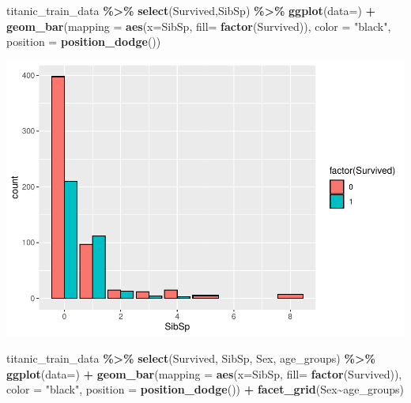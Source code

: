 \documentclass[
]{article}
\newenvironment{Shaded}{\begin{snugshade}}{\end{snugshade}}
\newcommand{\AttributeTok}[1]{\textcolor[rgb]{0.13,0.29,0.53}{#1}}
\newcommand{\FunctionTok}[1]{\textcolor[rgb]{0.13,0.29,0.53}{\textbf{#1}}}
\newcommand{\NormalTok}[1]{#1}
\newcommand{\SpecialCharTok}[1]{\textcolor[rgb]{0.81,0.36,0.00}{\textbf{#1}}}
\newcommand{\StringTok}[1]{\textcolor[rgb]{0.31,0.60,0.02}{#1}}
\begin{document}
\begin{Shaded}
\begin{Highlighting}[]
\NormalTok{titanic\_train\_data }\SpecialCharTok{\%\textgreater{}\%}
  \FunctionTok{select}\NormalTok{(Survived,SibSp) }\SpecialCharTok{\%\textgreater{}\%}
  \FunctionTok{ggplot}\NormalTok{(}\AttributeTok{data=}\NormalTok{) }\SpecialCharTok{+} 
  \FunctionTok{geom\_bar}\NormalTok{(}\AttributeTok{mapping =}  \FunctionTok{aes}\NormalTok{(}\AttributeTok{x=}\NormalTok{SibSp, }\AttributeTok{fill=} \FunctionTok{factor}\NormalTok{(Survived)), }\AttributeTok{color =} \StringTok{"black"}\NormalTok{, }\AttributeTok{position =} \FunctionTok{position\_dodge}\NormalTok{())}
\end{Highlighting}
\end{Shaded}

\includegraphics{Titanic-Documentation_files/figure-latex/unnamed-chunk-31-1.pdf}

\begin{Shaded}
\begin{Highlighting}[]
\NormalTok{titanic\_train\_data }\SpecialCharTok{\%\textgreater{}\%}
  \FunctionTok{select}\NormalTok{(Survived, SibSp, Sex, age\_groups) }\SpecialCharTok{\%\textgreater{}\%}
  \FunctionTok{ggplot}\NormalTok{(}\AttributeTok{data=}\NormalTok{) }\SpecialCharTok{+} 
  \FunctionTok{geom\_bar}\NormalTok{(}\AttributeTok{mapping =}  \FunctionTok{aes}\NormalTok{(}\AttributeTok{x=}\NormalTok{SibSp, }\AttributeTok{fill=} \FunctionTok{factor}\NormalTok{(Survived)), }\AttributeTok{color =} \StringTok{"black"}\NormalTok{, }\AttributeTok{position =} \FunctionTok{position\_dodge}\NormalTok{()) }\SpecialCharTok{+}
  \FunctionTok{facet\_grid}\NormalTok{(Sex}\SpecialCharTok{\textasciitilde{}}\NormalTok{age\_groups)}
\end{Highlighting}
\end{Shaded}
\end{document}
